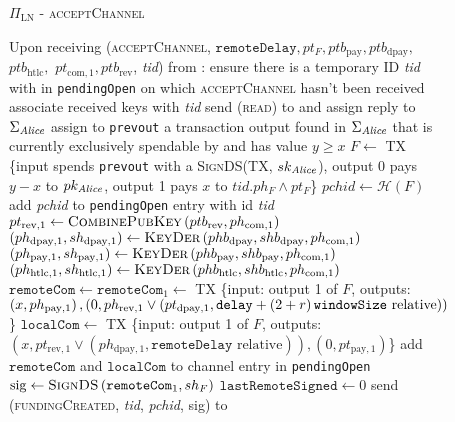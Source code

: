   \begin{figure}[H]
    \begin{protocolbox}{$\Pi_{\mathrm{LN}}$ - \textsc{acceptChannel}}
      \begin{algorithmic}[1]
        \State Upon receiving (\textsc{acceptChannel}, $\mathtt{remoteDelay},
        pt_F, ptb_{\mathrm{pay}}, ptb_{\mathrm{dpay}},$ $ptb_{\mathrm{htlc}},$
        $pt_{\mathrm{com}, 1}, ptb_{\mathrm{rev}}$, \textit{tid}) from \bob:
        \Indent
          \State ensure there is a temporary ID \textit{tid} with \bob{} in
          \texttt{pendingOpen} on which \textsc{acceptChannel} hasn't been
          received
          \State associate received keys with \textit{tid}
          \State send (\textsc{read}) to \ledger{} and assign reply to
          $\Sigma_{\mathit{Alice}}$
          \State assign to \texttt{prevout} a transaction output found in
          $\Sigma_{\mathit{Alice}}$ that is currently exclusively spendable by \alice{}
          and has value $y \geq x$
          \State $F \gets$ TX \{input spends \texttt{prevout} with a
          \textsc{SignDS}(TX, $sk_{\mathit{Alice}}$), output 0 pays $y - x$ to
          $pk_{\mathit{Alice}}$, output 1 pays $x$ to $\mathit{tid}.ph_F \wedge pt_F$\}
          \State $\mathit{pchid} \gets \mathcal{H}\left(F\right)$
          \State add \textit{pchid} to \texttt{pendingOpen} entry with id
          \textit{tid}
          \State $pt_{\mathrm{rev}, 1} \gets
          \textsc{CombinePubKey}\left(ptb_{\mathrm{rev}}, ph_{\mathrm{com},
          1}\right)$
          \State $(ph_{\mathrm{dpay}, 1}, sh_{\mathrm{dpay}, 1}) \gets
          \textsc{KeyDer}\left(phb_{\mathrm{dpay}}, shb_{\mathrm{dpay}},
          ph_{\mathrm{com}, 1}\right)$
          \State $(ph_{\mathrm{pay}, 1}, sh_{\mathrm{pay}, 1}) \gets
          \textsc{KeyDer}\left(phb_{\mathrm{pay}}, shb_{\mathrm{pay}},
          ph_{\mathrm{com}, 1}\right)$
          \State $(ph_{\mathrm{htlc}, 1}, sh_{\mathrm{htlc}, 1}) \gets
          \textsc{KeyDer}\left(phb_{\mathrm{htlc}}, shb_{\mathrm{htlc}},
          ph_{\mathrm{com}, 1}\right)$
          \State $\mathtt{remoteCom} \gets \mathtt{remoteCom}_1 \gets$ TX
          \{input: output 1 of $F$, outputs: $\left(x, ph_{\mathrm{pay},
          1}\right), \left(0, ph_{\mathrm{rev}, 1} \vee \left(pt_{\mathrm{dpay},
          1}, \mathtt{delay} + \left(2 + r\right)\texttt{windowSize}{} \text{ relative}\right)\right)$\}
          \State $\mathtt{localCom} \gets$ TX \{input: output 1 of $F$, outputs:
          $\left(x, pt_{\mathrm{rev}, 1} \vee \left(ph_{\mathrm{dpay}, 1},
          \mathtt{remoteDelay} \text{ relative}\right)\right), \left(0,
          pt_{\mathrm{pay}, 1}\right)$\}
          \State add $\mathtt{remoteCom}$ and $\mathtt{localCom}$ to channel
          entry in \texttt{pendingOpen}
          \State $\mathrm{sig} \gets \textsc{SignDS}\left(\mathtt{remoteCom}_1,
          sh_F\right)$
          \State $\mathtt{lastRemoteSigned} \gets 0$
          \State send (\textsc{fundingCreated}, \textit{tid},
          \textit{pchid}, sig) to \bob{}
        \EndIndent
      \end{algorithmic}
    \end{protocolbox}
    \caption{}
    \label{alg:protocol:open:acceptChannel}
  \end{figure}

